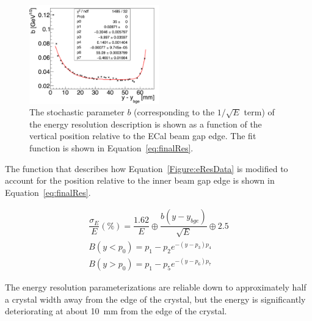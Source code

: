 \begin{figure}[H]
  \centering
      \includegraphics[width=0.5\textwidth]{pics/performance/eResEdgeEffect.png}
  \caption[Characterization of the energy resolution edge effects ]{The stochastic parameter $b$ (corresponding to the $1/\sqrt{E}$ term) of the energy resolution description is shown as a function of the vertical position relative to the ECal beam gap edge. The fit function is shown in Equation~\eqref{eq:finalRes}.}
  \label{Figure:stochasticEdge}
\end{figure}

The function that describes how Equation~\eqref{Figure:eResData} is modified to account for the position relative to the inner beam gap edge is shown in Equation~\eqref{eq:finalRes}.

\begin{equation}
\begin{split}
\label{eq:finalRes}
\dfrac{\sigma_E}{E}(\%)=\dfrac{1.62}{E}\oplus \dfrac{b(y-y_{bge})}{\sqrt{E}} \oplus 2.5 \\
B(y<p_0) = p_1-p_2 e^{-(y-p_3)p_4}\\
B(y>p_0) = p_1-p_5 e^{-(y-p_6)p_7}
\end{split}
\end{equation}

The energy resolution parameterizations are reliable down to approximately half a crystal width away from the edge of the crystal, but the energy is significantly deteriorating at about 10~mm from the edge of the crystal. ~\cite{szumila-vance_hps_2016}
